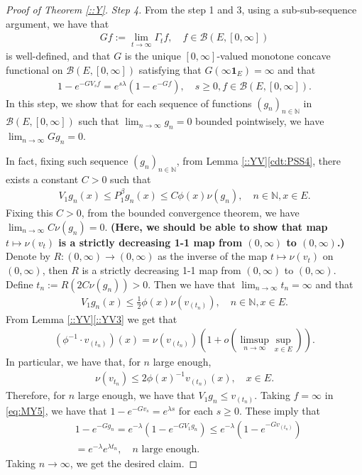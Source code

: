\documentclass[12pt,a4paper]{amsart}
\numberwithin{equation}{section}
\theoremstyle{plain}
\theoremstyle{definition}
\theoremstyle{remark}
\begin{document}
\begin{proof}[Proof of Theorem \ref{::Y}]
\emph{Step 4.}
From the step 1 and 3, using a sub-sub-sequence argument, we have that 
\begin{align}
	Gf
  := \lim_{t\to \infty} \Gamma_tf, \quad f\in \mathcal B(E,[0,\infty])
\end{align}
is well-defined, and that $G$ is the unique $[0,\infty]$-valued monotone concave functional on $\mathcal B(E,[0,\infty])$ satisfying that $G(\infty \mathbf 1_E) = \infty$ and that
\begin{align}
  \label{eq:MY5}
  1 - e^{- G V_sf} = e^{s\lambda} (1- e^{- G f}),
  \quad s \geq 0, f \in \mathcal B(E, [0,\infty]).
\end{align}
In this step, we show that for each sequence of functions $(g_{n})_{n\in \mathbb N}$ in $\mathcal B(E, [0,\infty])$ such that $\lim_{n \to \infty} g_n = 0$ bounded pointwisely, we have $\lim_{n \to \infty} G g_n = 0$.


In fact, fixing such sequence $(g_{n})_{n\in \mathbb N}$, from Lemma \ref{::YV}\ref{cdt:PSS4}, there exists a constant $C > 0$ such that 
\begin{align}
	V_1 g_n(x) \leq P^\beta_1 g_n(x) \leq C \phi(x) \nu(g_n),
  \quad n \in \mathbb N, x\in E.
\end{align}
Fixing this $C>0$, from the bounded convergence theorem, we have $\lim_{n\to \infty}C \nu(g_n) =0$.
{\bf (Here, we should be able to show that map $t \mapsto \nu(v_t)$ is a strictly decreasing 1-1 map from $(0,\infty)$ to $(0,\infty)$.)}
Denote by $R:(0,\infty) \to (0,\infty)$ as the inverse of the map $t \mapsto \nu(v_t)$ on $(0,\infty)$, then $R$ is a strictly decreasing 1-1 map from $(0,\infty)$ to $(0,\infty)$. 
Define $t_n := R(2C\nu(g_n))> 0$.
Then we have that $\lim_{n\to \infty} t_n = \infty$ and that 
\begin{align}
	V_1 g_n(x) \leq \frac{1}{2} \phi(x) \nu(v_{(t_n)}), 
\quad n \in \mathbb N, x\in E.
\end{align}
From Lemma \ref{::YV}\eqref{::YV3} we get that
\begin{align}
 (\phi^{-1} \cdot v_{(t_n)})(x) 
  = \nu(v_{(t_n)}) ( 1+ o(\limsup_{n\to \infty} \sup_{x\in E}) ).
\end{align}
In particular, we have that, for $n$ large enough,
\begin{align}
	\nu(v_{t_n}) \leq 2 \phi(x)^{-1} v_{(t_n)}(x), \quad x\in E.
\end{align}
Therefore, for $n$ large enough, we have that $V_1g_n \leq v_{(t_n)}$.
Taking $f = \infty$ in \eqref{eq:MY5}, we have that $1 - e^{- Gv_s} = e^{\lambda s}$ for each $s\geq 0$.
These imply that
\begin{align}
	& 1 - e^{- Gg_n}
  = e^{- \lambda} (1- e^{- GV_1g_n})
  \leq e^{- \lambda} (1- e^{- G v_{(t_n)}}) \\
  & = e^{- \lambda} e^{\lambda t_n},
  \quad \text{$n$ large enough.}
\end{align} 
Taking $n\to \infty$, we get the desired claim.


\end{proof}
\end{document}
